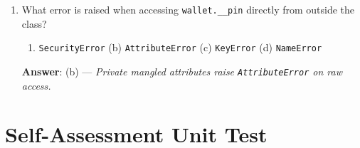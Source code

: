 \begin{enumerate}[leftmargin=1.5em]
    \item What error is raised when accessing \texttt{wallet.\_\_pin} directly from outside the class?
    \begin{enumerate}[label=(\alph*)]
        \item \texttt{SecurityError} \quad (b) \texttt{AttributeError} \quad (c) \texttt{KeyError} \quad (d) \texttt{NameError}
    \end{enumerate}
    \textbf{Answer}: (b) --- \textit{Private mangled attributes raise \texttt{AttributeError} on raw access.}
\end{enumerate}

\section{Self-Assessment Unit Test}

